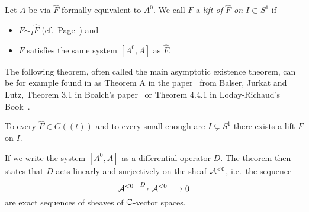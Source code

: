 \begin{defn}\label{defn:lift}
  Let $A$ be via $\hat F$ formally equivalent to $A^0$.
  We call $F$ a \emph{lift of $\hat F$ on $I\subset S^1$} if
  \begin{itemize}
    \item $F\sim_I\hat F$
      (cf.\ Page~\pageref{page:notationForAsymptoticExpansion}) and
    \item $F$ satisfies the same system $[A^0,A]$ as $\hat F$.
  \end{itemize}
\end{defn}
The following theorem, often called the main asymptotic existence theorem, can
be for example found in as Theorem A in the paper~\cite{BJL1979Birkhoff} from
Balser, Jurkat and Lutz, Theorem 3.1 in Boalch's paper~\cite[Thm.3.1]{boalch}
or Theorem 4.4.1 in Loday-Richaud's Book~\cite{Loday2014}.
\begin{thm}[M.A.E.T]\label{thm:maet}
  To every $\hat F\in G(\!(t)\!)$ and to every small enough arc
  $I\subsetneq S^1$ there exists a lift $F$ on $I$.
  \begin{s-rem}
    If we write the system $[A^0,A]$ as a differential operator $D$.
    The theorem then states that $D$ acts linearly and surjectively on the
    sheaf $\mathcal{A}^{<0}$, i.e.\ the sequence
    \[
      \mathcal{A}^{<0}\overset{D}\longrightarrow\mathcal{A}^{<0} \longrightarrow 0
    \]
    are exact sequences of sheaves of $\mathbb{C}$-vector spaces.
    \begin{comment}
      (cf.~\cite[App.1;Thm.1]{malgrange1991})
    \end{comment}
  \end{s-rem}
\end{thm}
\begin{comment}
  \PROBLEM[Think about it?]
  In the language of meromorphic connections is this theorem sometimes called
  \emph{sectorial decomposition} and stated for example
  in~\cite[Thm.II.5.12]{sabbah2007isomonodromic}
  and~\cite[Sec.II.2.4]{sabbah_cimpa90}.
\end{comment}
\begin{comment}
  \begin{thm}[Sectorial decomposition]
    \PROBLEM[needs more defns]
    Let $(\cM,\nabla)$ be a meromorphic connection and let
    $\hat\lambda:\hat\cM\to\hat\cM^{nf}$ be the isomorphism given by
    Theorem~\ref{thm:leveltTurittin} together with the model $\cM^{nf}$.
    There exists then, for any $e^{i\theta^0}\in S^1$, an isomorphism
    $\tilde\lambda_{\theta^0}:
    \tilde\cM_{\theta^0}=\cA_{\theta^0}\otimes\cM\to\tilde\cM_{\theta^0}^{nf}$
    lifting $\hat\lambda$ \rewrite{that is, such that} the following diagram
    \[ \begin{tikzcd}
        \tilde\cM_{\theta^o} \dar \rar{\tilde\lambda_{\theta^o}} &
        \tilde\cM^{nf}_{\theta^o} \dar
        \\\hat\cM \rar{\hat\lambda} &
        \hat\cM^{nf}
    \end{tikzcd} \]
    commutes
  \end{thm}
\end{comment}

